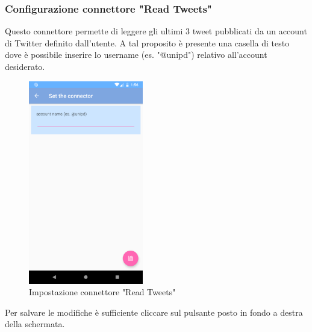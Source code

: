 \subsubsection{Configurazione connettore "Read Tweets"}
Questo connettore permette di leggere gli ultimi 3 tweet pubblicati da un account di Twitter definito dall'utente. A tal proposito è presente una casella di testo dove è possibile inserire lo username (es. "@unipd") relativo all'account desiderato.
\begin{figure}[H]
	\centering
	\includegraphics[width=5cm]{../includes/pics/conf_read_tweet.png}
	\caption{\label{fig:conf_read_tweet}Impostazione connettore "Read Tweets"}
\end{figure}
Per salvare le modifiche è sufficiente cliccare sul pulsante posto in fondo a destra della schermata.

